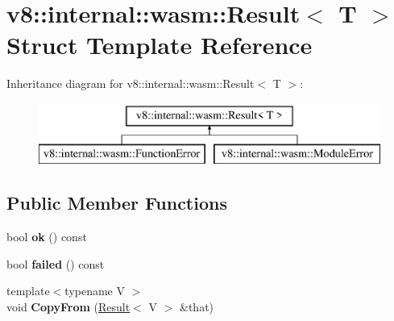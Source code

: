 \hypertarget{structv8_1_1internal_1_1wasm_1_1_result}{}\section{v8\+:\+:internal\+:\+:wasm\+:\+:Result$<$ T $>$ Struct Template Reference}
\label{structv8_1_1internal_1_1wasm_1_1_result}
Inheritance diagram for v8\+:\+:internal\+:\+:wasm\+:\+:Result$<$ T $>$\+:\begin{figure}[H]
\begin{center}
\leavevmode
\includegraphics[height=2.000000cm]{structv8_1_1internal_1_1wasm_1_1_result}
\end{center}
\end{figure}
\subsection*{Public Member Functions}
\begin{DoxyCompactItemize}
\item 
bool {\bfseries ok} () const \hypertarget{structv8_1_1internal_1_1wasm_1_1_result_a7a7ce78069f9fdb57dd9cc6eff687a1d}{}\label{structv8_1_1internal_1_1wasm_1_1_result_a7a7ce78069f9fdb57dd9cc6eff687a1d}

\item 
bool {\bfseries failed} () const \hypertarget{structv8_1_1internal_1_1wasm_1_1_result_abe3221cddc0e8556b6de05141da6dacb}{}\label{structv8_1_1internal_1_1wasm_1_1_result_abe3221cddc0e8556b6de05141da6dacb}

\item 
{\footnotesize template$<$typename V $>$ }\\void {\bfseries Copy\+From} (\hyperlink{structv8_1_1internal_1_1wasm_1_1_result}{Result}$<$ V $>$ \&that)\hypertarget{structv8_1_1internal_1_1wasm_1_1_result_a475f75b6616b070f8c0d2eef79256ddb}{}\label{structv8_1_1internal_1_1wasm_1_1_result_a475f75b6616b070f8c0d2eef79256ddb}

\end{DoxyCompactItemize}
